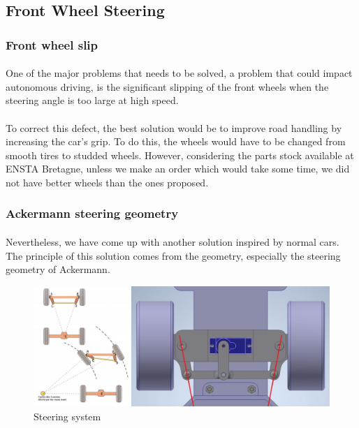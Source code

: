 \subsection{Front Wheel Steering}

\subsubsection{Front wheel slip}
\paragraph{}
One of the major problems that needs to be solved, a problem that could impact
autonomous driving, is the significant slipping of the front wheels when the steering
angle is too large  at high speed.

\paragraph{}
To correct this defect, the best solution would be to improve road handling by
increasing the car's grip. To do this, the wheels would have to be changed from
smooth tires to studded wheels.
However, considering the parts stock available at ENSTA Bretagne, unless we
make an order which would take some time, we did not have better wheels than the
ones proposed.

\subsubsection{Ackermann steering geometry}
\paragraph{}
Nevertheless, we have come up with another solution inspired by normal cars.
The principle of this solution comes from the geometry, especially the steering
geometry of Ackermann.

\begin{figure}[!ht]
    \begin{center}
        \includegraphics[scale=0.45]{Images/steering.jpg}
    \end{center}
    \caption{Steering system}
    \label{fig:steering}
\end{figure}

